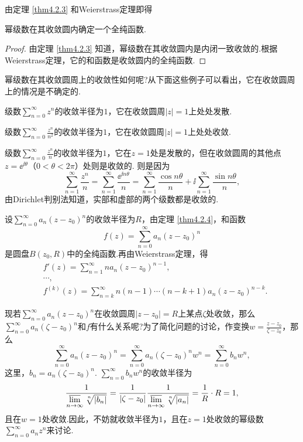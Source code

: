 由定理 \ref{thm4.2.3} 和Weierstrass定理即得
\begin{theorem}\label{thm4.2.4}
幂级数在其收敛圆内确定一个全纯函数.
\end{theorem}
\begin{proof}
由定理 \ref{thm4.2.3} 知道，幂级数在其收敛圆内是内闭一致收敛的.根据Weierstrass定理，它的和函数是收敛圆内的全纯函数.
\end{proof}

幂级数在其收敛圆周上的收敛性如何呢?从下面这些例子可以看出，它在收敛圆周上的情况是不确定的.

\begin{example}\label{exam4.2.5}
级数$\sum_{n=0}^\infty z^n$的收敛半径为$1$，它在收敛圆周$|z|=1$上处处发散.
\end{example}
\begin{example}\label{exam4.2.6}
级数$\sum_{n=0}^\infty \frac{z^n}{n^2}$的收敛半径为$1$，它在收敛圆周$|z|=1$上处处收敛.
\end{example}
\begin{example}
级数$\sum_{n=0}^\infty \frac{z^n}{n}$的收敛半径为$1$，它在$z=1$处是发散的，但在收敛圆周的其他点$z=\ee^{\ii\theta}$（$0<\theta<2\pi$）处则是收敛的. 则是因为
\[\sum_{n=1}^\infty\frac{z^n}n=\sum_{n=1}^\infty \frac{\ee^{\ii n\theta}}n=\sum_{n=1}^\infty\frac{\cos n\theta}n+\ii\sum_{n=1}^\infty\frac{\sin n\theta}n,\]
由Dirichlet判别法知道，实部和虚部的两个级数都是收敛的.
\end{example}

设$\sum_{n=0}^\infty a_n(z-z_0)^n$的收敛半径为$R$，由定理 \ref{thm4.2.4}，和函数
\[f(z)=\sum_{n=0}^\infty a_n(z-z_0)^n\]
是圆盘$B(z_0,R)$中的全纯函数.再由Weierstrass定理，得
\begin{align*}
&f'(z)=\sum_{n=1}^\infty na_n(z-z_0)^{n-1},\\
&\cdots,\\
&f^{(k)}(z)=\sum_{n=k}^\infty n(n-1)\cdots(n-k+1)a_n(z-z_0)^{n-k}.
\end{align*}

现若$\sum_{n=0}^\infty a_n(z-z_0)^n$在收敛圆周$|z-z_0|=R$上某点$\zeta$处收敛，那么$\sum_{n=0}^\infty a_n(\zeta-z_0)^n$和$f$有什么关系呢?为了简化问题的讨论，作变换$w=\frac{z-z_0}{\zeta-z_0}$，那么
\[\sum_{n=0}^\infty a_n(z-z_0)^n=\sum_{n=0}^\infty a_n(\zeta-z_0)^nw^n=\sum_{n=0}^\infty b_nw^n,\]
这里，$b_n=a_n(\zeta-z_0)^n$. $\sum_{n=0}^\infty b_nw^n$的收敛半径为
\[\frac1{\varlimsup\limits_{n\to\infty}\sqrt[\leftroot{-1}\uproot{2}n]{|b_n|}}
=\frac1{|\zeta-z_0|}\frac1{\varlimsup\limits_{n\to\infty}\sqrt[\leftroot{-1}
\uproot{2}n]{|a_n|}}=\frac1R\cdot R=1,\]
且在$w=1$处收敛.因此，不妨就收敛半径为$1$，且在$z=1$处收敛的幂级数$\sum_{n=0}^\infty a_nz^n$来讨论.

